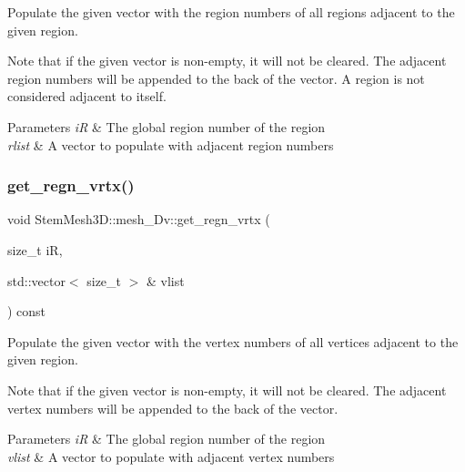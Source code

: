 Populate the given vector with the region numbers of all regions adjacent to the given region. 

Note that if the given vector is non-\/empty, it will not be cleared. The adjacent region numbers will be appended to the back of the vector. A region is not considered adjacent to itself. 
\begin{DoxyParams}{Parameters}
{\em iR} & The global region number of the region \\
\hline
{\em rlist} & A vector to populate with adjacent region numbers \\
\hline
\end{DoxyParams}
\mbox{\label{classStemMesh3D_1_1mesh__3Dv_a063d41ebed2be9a826b8254f38a0c7d9}} 
\subsubsection{\texorpdfstring{get\+\_\+regn\+\_\+vrtx()}{get\_regn\_vrtx()}}
{\footnotesize\ttfamily void Stem\+Mesh3\+D\+::mesh\+\_\+Dv\+::get\+\_\+regn\+\_\+vrtx (\begin{DoxyParamCaption}\item[{size\+\_\+t}]{iR,  }\item[{std\+::vector$<$ size\+\_\+t $>$ \&}]{vlist }\end{DoxyParamCaption}) const}



Populate the given vector with the vertex numbers of all vertices adjacent to the given region. 

Note that if the given vector is non-\/empty, it will not be cleared. The adjacent vertex numbers will be appended to the back of the vector. 
\begin{DoxyParams}{Parameters}
{\em iR} & The global region number of the region \\
\hline
{\em vlist} & A vector to populate with adjacent vertex numbers \\
\hline
\end{DoxyParams}
\mbox{\label{classStemMesh3D_1_1mesh__3Dv_a5977abe45fc95cde4e0125c09df953b1}} 
